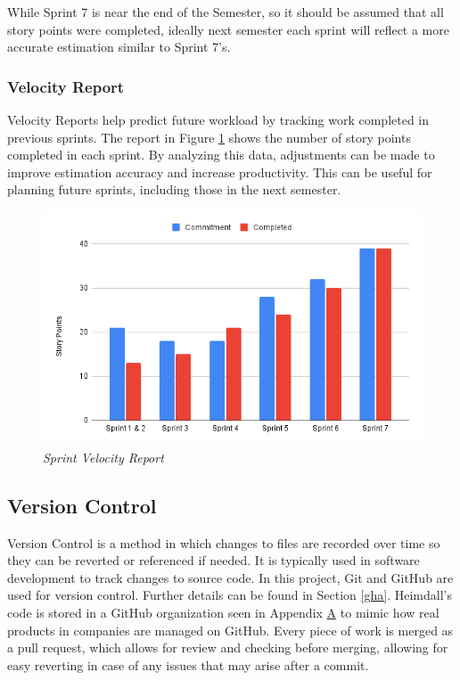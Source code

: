 \documentclass{article}
\begin{document}
While Sprint 7 is near the end of the Semester, so it should be assumed that all story points were completed, ideally next semester each sprint will reflect a more accurate estimation similar to Sprint 7's.

\subsubsection{Velocity Report}

Velocity Reports help predict future workload by tracking work completed in previous sprints. The report in Figure \ref{velocity} shows the number of story points completed in each sprint. By analyzing this data, adjustments can be made to improve estimation accuracy and increase productivity. This can be useful for planning future sprints, including those in the next semester.

\begin{figure}[H]
    \centering
    \includegraphics[width=120mm]{methodology/velocity.png}
    \caption{\emph{Sprint Velocity Report}}
    \label{velocity}
\end{figure}


\subsection{Version Control} \label{version-ctrl}
Version Control is a method in which changes to files are recorded over time so they can be reverted or referenced if needed. It is typically used in software development to track changes to source code. In this project, Git and GitHub are used for version control. Further details can be found in Section \ref{gha}. Heimdall's code is stored in a GitHub organization seen in Appendix \hyperlink{appendix-a}{A} to mimic how real products in companies are managed on GitHub. Every piece of work is merged as a pull request, which allows for review and checking before merging, allowing for easy reverting in case of any issues that may arise after a commit.
\end{document}
